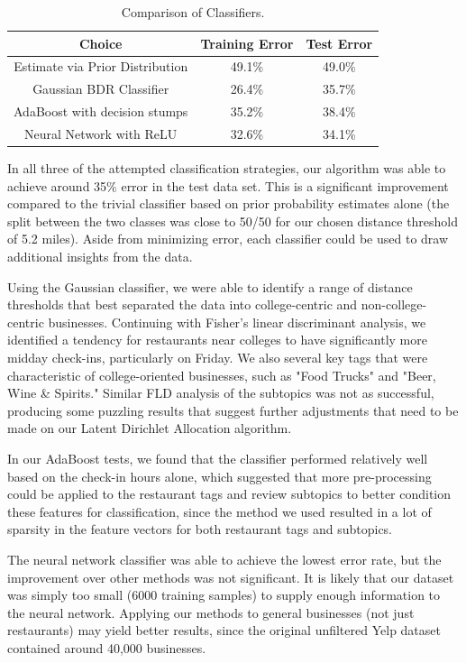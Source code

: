 \documentclass[10pt,twocolumn,letterpaper]{article}
\begin{document}
\begin{table}[H]
  \centering
  \begin{tabular}{|c|c|c|}
    \hline
    Choice &         Training Error            & Test Error\tabularnewline
    \hline
    \hline
    \small{Estimate via Prior Distribution} &  49.1\%  & 49.0\% \tabularnewline
    \hline
    \small{Gaussian BDR Classifier}         &  26.4\%  & 35.7\% \tabularnewline
    \hline
    \small{AdaBoost with decision stumps}   &  35.2\%  & 38.4\% \tabularnewline
    \hline
    \small{Neural Network with ReLU}        &  32.6\%  & 34.1\%\tabularnewline
    \hline
  \end{tabular}
  \caption{Comparison of Classifiers.}\label{table:results_all_classifiers}
\end{table}

In all three of the attempted classification strategies, our algorithm was able
to achieve around 35\% error in the test data set. This is a significant
improvement compared to the trivial classifier based on prior probability
estimates alone (the split between the two classes was close to 50/50 for our
chosen distance threshold of 5.2 miles). Aside from minimizing error, each
classifier could be used to draw additional insights from the data.

Using the Gaussian classifier, we were able to identify a range of distance
thresholds that best separated the data into college-centric and
non-college-centric businesses. Continuing with Fisher's linear discriminant
analysis, we identified a tendency for restaurants near colleges to have
significantly more midday check-ins, particularly on Friday. We also several key
tags that were characteristic of college-oriented businesses, such as "Food
Trucks" and "Beer, Wine \& Spirits." Similar FLD analysis of the subtopics was
not as successful, producing some puzzling results that suggest further
adjustments that need to be made on our Latent Dirichlet Allocation algorithm.

In our AdaBoost tests, we found that the classifier performed relatively well
based on the check-in hours alone, which suggested that more pre-processing
could be applied to the restaurant tags and review subtopics to better condition
these features for classification, since the method we used resulted in a lot of
sparsity in the feature vectors for both restaurant tags and subtopics.

The neural network classifier was able to achieve the lowest error rate, but the
improvement over other methods was not significant. It is likely that our
dataset was simply too small (6000 training samples) to supply enough
information to the neural network. Applying our methods to general businesses
(not just restaurants) may yield better results, since the original unfiltered
Yelp dataset contained around 40,000 businesses.
\end{document}
